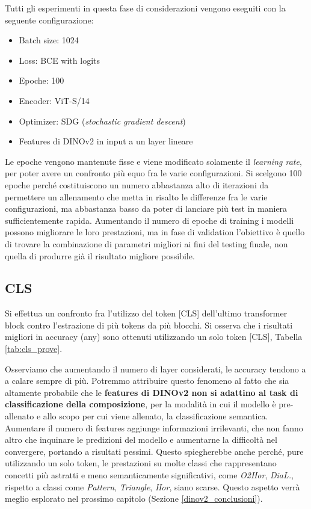 Tutti gli esperimenti in questa fase di considerazioni vengono eseguiti con la seguente configurazione:
\begin{itemize}
    \item Batch size: 1024
    \item Loss: BCE with logits
    \item Epoche: 100
    \item Encoder: ViT-S/14
    \item Optimizer: SDG (\textit{stochastic gradient descent})
    \item Features di DINOv2 in input a un layer lineare
\end{itemize}
Le epoche vengono mantenute fisse e viene modificato solamente il \textit{learning rate}, per poter avere un confronto più equo fra le varie configurazioni. Si scelgono 100 epoche perché costituiscono un numero abbastanza alto di iterazioni da permettere un allenamento che metta in risalto le differenze fra le varie configurazioni, ma abbastanza basso da poter di lanciare più test in maniera sufficientemente rapida. Aumentando il numero di epoche di training i modelli possono migliorare le loro prestazioni, ma in fase di validation l'obiettivo è quello di trovare la combinazione di parametri migliori ai fini del testing finale, non quella di produrre già il risultato migliore possibile.

\subsection{CLS}
Si effettua un confronto fra l'utilizzo del token [CLS] dell'ultimo transformer block contro l'estrazione di più tokens da più blocchi. Si osserva che i risultati migliori in accuracy (any) sono ottenuti utilizzando un solo token [CLS], Tabella \ref{tab:cls_prove}. 

Osserviamo che aumentando il numero di layer considerati, le accuracy tendono a a calare sempre di più. Potremmo attribuire questo fenomeno al fatto che sia altamente probabile che le \textbf{features di DINOv2 non si adattino al task di classificazione della composizione}, per la modalità in cui il modello è pre-allenato e allo scopo per cui viene allenato, la classificazione semantica. Aumentare il numero di features aggiunge informazioni irrilevanti, che non fanno altro che inquinare le predizioni del modello e aumentarne la difficoltà nel convergere, portando a risultati pessimi. Questo spiegherebbe anche perché, pure utilizzando un solo token, le prestazioni su molte classi che rappresentano concetti più astratti e meno semanticamente significativi, come \textit{O2Hor}, \textit{DiaL.}, rispetto a classi come \textit{Pattern}, \textit{Triangle}, \textit{Hor}, siano scarse. Questo aspetto verrà meglio esplorato nel prossimo capitolo (Sezione \ref{dinov2_conclusioni}).

